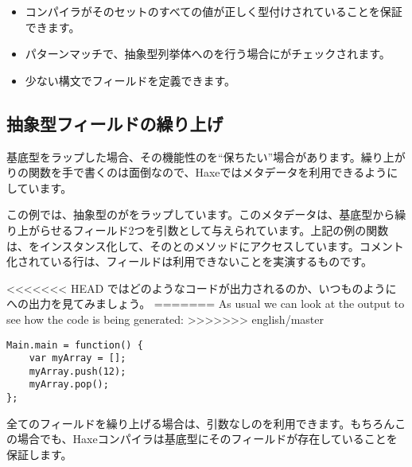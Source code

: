 \begin{itemize}
	\item コンパイラがそのセットのすべての値が正しく型付けされていることを保証できます。
	\item パターンマッチで、抽象型列挙体へのを行う場合にがチェックされます。
	\item 少ない構文でフィールドを定義できます。
\end{itemize}


\subsection{抽象型フィールドの繰り上げ}
\label{types-abstract-forward}

基底型をラップした場合、その機能性のを``保ちたい''場合があります。繰り上がりの関数を手で書くのは面倒なので、Haxeではメタデータを利用できるようにしています。


この例では、抽象型のがをラップしています。このメタデータは、基底型から繰り上がらせるフィールド2つを引数として与えられています。上記の例の関数は、をインスタンス化して、そのとのメソッドにアクセスしています。コメント化されている行は、フィールドは利用できないことを実演するものです。

<<<<<<< HEAD
ではどのようなコードが出力されるのか、いつものようにへの出力を見てみましょう。
=======
As usual we can look at the  output to see how the code is being generated:
>>>>>>> english/master

\begin{lstlisting}
Main.main = function() {
	var myArray = [];
	myArray.push(12);
	myArray.pop();
};
\end{lstlisting}

全てのフィールドを繰り上げる場合は、引数なしのを利用できます。もちろんこの場合でも、Haxeコンパイラは基底型にそのフィールドが存在していることを保証します。



